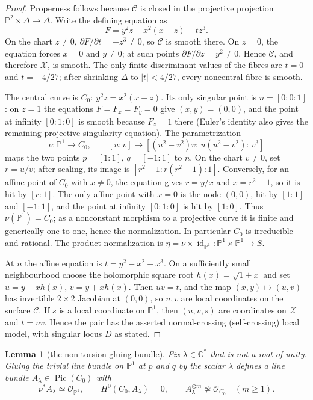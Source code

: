 \documentclass[11pt]{amsart}
\newcommand{\C}{\mathbb C}
\renewcommand{\P}{\mathbb P}
\newcommand{\cO}{\mathcal O}
\newcommand{\Pic}{\operatorname{Pic}}
\newcommand{\id}{\operatorname{id}}
\theoremstyle{plain}
\newtheorem{lemma}[theorem]{Lemma}
\theoremstyle{definition}
\theoremstyle{remark}
\begin{document}
\begin{proof}
Properness follows because $\mathscr C$ is closed in the projective
projection $\P^2\times\Delta\to\Delta$.  Write the defining equation as
\[
 F=y^2z-x^2(x+z)-tz^3.
\]
On the chart $z\ne0$, $\partial F/\partial t=-z^3\ne0$, so $\mathscr C$
is smooth there.  On $z=0$, the equation forces $x=0$ and $y\ne0$; at such
points $\partial F/\partial z=y^2\ne0$.  Hence $\mathscr C$, and therefore
$\mathcal X$, is smooth.  The only finite discriminant values of the fibres
are $t=0$ and $t=-4/27$; after shrinking $\Delta$ to $|t|<4/27$, every
noncentral fibre is smooth.

The central curve is
\(C_0:\ y^2z=x^2(x+z)\).  Its only singular point is
\(n=[0:0:1]\): on $z=1$ the equations $F=F_x=F_y=0$ give $(x,y)=(0,0)$,
and the point at infinity $[0:1:0]$ is smooth because $F_z=1$ there
(Euler's identity also gives the remaining projective singularity equation).
The parametrization
\[
 \nu:\P^1\longrightarrow C_0,\qquad
 [u:v]\longmapsto
 [(u^2-v^2)v:\,u(u^2-v^2):\,v^3]
 \tag{4.3}
\]
maps the two points $p=[1:1]$, $q=[-1:1]$ to $n$.  On the chart $v\ne0$, set
$r=u/v$; after scaling, its image is
$[r^2-1:r(r^2-1):1]$.  Conversely, for an affine point of $C_0$ with
$x\ne0$, the equation gives $r=y/x$ and $x=r^2-1$, so it is hit by
$[r:1]$.  The only affine point with $x=0$ is the node $(0,0)$, hit by
$[1:1]$ and $[-1:1]$, and the point at infinity $[0:1:0]$ is hit by
$[1:0]$.  Thus $\nu(\P^1)=C_0$; as a nonconstant morphism to a projective
curve it is finite and generically one-to-one, hence the normalization.  In
particular $C_0$ is irreducible and rational.  The product normalization
is $\eta=\nu\times\id_{\P^1}:\P^1\times\P^1\to S$.

At $n$ the affine equation is
\(t=y^2-x^2-x^3\).  On a sufficiently small neighbourhood choose the
holomorphic square root $h(x)=\sqrt{1+x}$ and set
\(u=y-xh(x)\), \(v=y+xh(x)\).  Then $uv=t$, and the map
$(x,y)\mapsto(u,v)$ has invertible $2\times2$ Jacobian at $(0,0)$, so $u,v$
are local coordinates on the surface $\mathscr C$.  If $s$ is a local
coordinate on $\P^1$, then $(u,v,s)$ are coordinates on $\mathcal X$ and
$t=uv$.  Hence the pair has the asserted normal-crossing (self-crossing)
local model, with singular locus $D$ as stated.
\end{proof}

\begin{lemma}[the non-torsion gluing bundle]
\label{lem:gluing-bundle}
Fix $\lambda\in\C^*$ that is not a root of unity.  Gluing the trivial line
bundle on $\P^1$ at $p$ and $q$ by the scalar $\lambda$ defines a line bundle
\(A_\lambda\in\Pic(C_0)\) with
\[
 \nu^*A_\lambda\simeq\cO_{\P^1},\qquad
 H^0(C_0,A_\lambda)=0,\qquad
 A_\lambda^{\otimes m}\not\simeq\cO_{C_0}\quad(m\ge1).
 \tag{4.4}
\]
\end{lemma}
\end{document}
